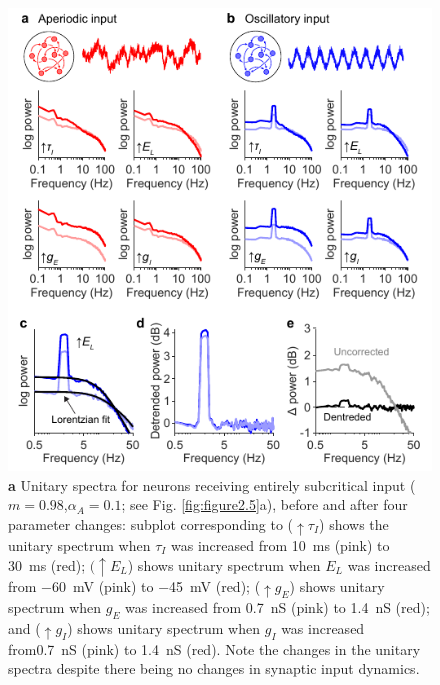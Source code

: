 \begin{figure}
  \begin{minipage}[c]{90mm}
    \includegraphics[width=\textwidth]{Figures/chapter2/figure7.pdf}
  \end{minipage}\hfill
  \begin{minipage}[c]{70mm}
    \vspace*{0.25cm}
    \caption{
	\textbf{a} Unitary spectra for neurons receiving entirely subcritical input ($m=0.98$,$\alpha_A=0.1$; see Fig. \ref{fig:figure2.5}a), before and after four parameter changes: subplot corresponding to ($\uparrow\tau_I$) shows the unitary spectrum when $\tau_I$  was increased from \qty{10}{\milli\second} (pink) to \qty{30}{\milli\second} (red); $(\uparrow E_L$) shows unitary spectrum when $E_L$ was increased from \qty{-60}{\milli\volt} (pink) to \qty{-45}{\milli\volt} (red); ($\uparrow g_E$) shows unitary spectrum when $g_E$ was increased from \qty{0.7}{\nano\siemens} (pink) to \qty{1.4}{\nano\siemens} (red); and ($\uparrow g_I$) shows unitary spectrum when $g_I$ was increased from\qty{0.7}{\nano\siemens} (pink) to \qty{1.4}{\nano\siemens} (red). Note the changes in the unitary spectra despite there being no changes in synaptic input dynamics.
}
\end{minipage}
\end{figure}
